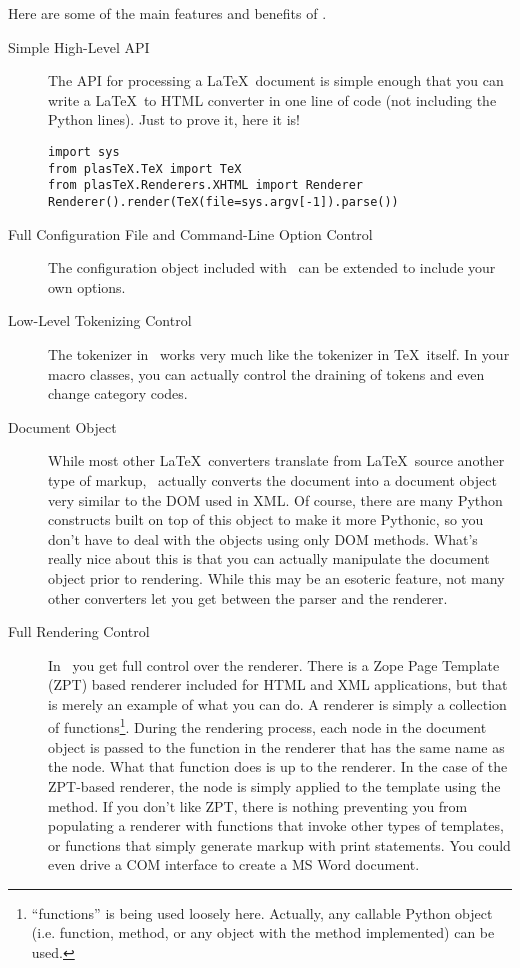 Here are some of the main features and benefits of \plasTeX.
\begin{description}
\item[Simple High-Level API] The API for processing a \LaTeX\ document
is simple enough that you can write a \LaTeX\ to HTML converter
in one line of code (not including the Python  lines).
Just to prove it, here it is!
\begin{verbatim}
import sys
from plasTeX.TeX import TeX
from plasTeX.Renderers.XHTML import Renderer
Renderer().render(TeX(file=sys.argv[-1]).parse())
\end{verbatim}

\item[Full Configuration File and Command-Line Option Control]
The configuration object included with \plasTeX\ can be extended to include
your own options.

\item[Low-Level Tokenizing Control] The tokenizer in \plasTeX\ works very 
much like the tokenizer in \TeX\ itself.  In your macro classes, you 
can actually control the draining of tokens and even change category codes.

\item[Document Object] While most other \LaTeX\ converters translate from
\LaTeX\ source another type of markup, \plasTeX\ actually converts the 
document into a document object very similar to the DOM used in XML.
Of course, there are many Python constructs built on top of this object
to make it more Pythonic, so you don't have to deal with the objects using
only DOM methods. What's really nice about this is that you can actually 
manipulate the document object prior to rendering.  While this may be an
esoteric feature, not many other converters let you get between the parser
and the renderer.

\item[Full Rendering Control] In \plasTeX\, you get full control over the
renderer.  There is a Zope Page Template (ZPT) based renderer included for HTML
and XML applications, but that is merely an example of what you can do.
A renderer is simply a collection of functions\footnote{``functions'' is being
used loosely here.  Actually, any callable Python object (i.e. function, method, 
or any object with the  method implemented) can be used.}.  
During the rendering
process, each node in the document object is passed to the function
in the renderer that has the same name as the node.  What that function
does is up to the renderer.  In the case of the ZPT-based renderer, the 
node is simply applied to the template using the  method.
If you don't like ZPT, there is nothing preventing you from populating
a renderer with functions that invoke other types of templates, or functions
that simply generate markup with print statements.  You could even drive
a COM interface to create a MS Word document.
\end{description}
